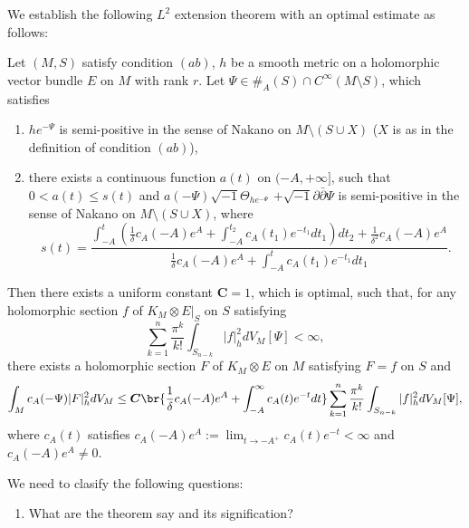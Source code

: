 \documentclass[twoside,openany,12pt]{beautynote}
\begin{document}
We establish the following $L^{2}$ extension theorem with an optimal
estimate as follows:

\begin{theorem}\label{t:guan-zhou-semicontinu2}
Let $(M,S)$ satisfy condition $(ab)$,
$h$ be a smooth metric on a holomorphic vector bundle $E$ on $M$ with rank $r$.
Let $\Psi\in \#_{A}(S)\cap C^{\infty}(M\setminus S)$, which satisfies

\begin{enumerate}[label=\arabic*)]
  \item $he^{-\Psi}$ is semi-positive in the sense of Nakano on
$M\setminus (S\cup X)$ ($X$ is as in the definition of condition
$(ab)$),
\item there exists a continuous function $a(t)$ on $(-A,+\infty]$,
such that $0<a(t)\leq s(t)$ and
$a(-\Psi)\sqrt{-1}\Theta_{he^{-\Psi}}$ $+\sqrt{-1}\partial\bar\partial\Psi$
is semi-positive in the sense of Nakano on $M\setminus (S\cup X)$,
where $$s(t)=\frac{\int_{-A}^{t}(\frac{1}
{\delta}c_{A}(-A)e^{A}+\int_{-A}^{t_{2}}c_{A}(t_{1})e^{-t_{1}}dt_{1})dt_{2}+\frac{1}{\delta^{2}}c_{A}(-A)e^{A}}
{\frac{1}{\delta}c_{A}(-A)e^{A}+\int_{-A}^{t}c_{A}(t_{1})e^{-t_{1}}dt_{1}}.$$
\end{enumerate}

Then there exists a uniform constant $\bm{C}=1$, which is
optimal, such that, for any holomorphic section $f$ of $K_{M}\otimes
E|_{S}$ on $S$ satisfying
\begin{equation}
\label{equ:condition}
\sum_{k=1}^{n}\frac{\pi^{k}}{k!}\int_{S_{n-k}}|f|^{2}_{h}dV_{M}[\Psi]<\infty,
\end{equation}
there
exists a holomorphic section $F$ of $K_{M}\otimes E$ on $M$ satisfying $F = f$ on $ S$ and
\begin{equation}
\label{equ:optimal_delta}
\int_{M}c_{A}(-\Psi)|F|^{2}_{h}dV_{M}
\leq\bm{C}\br{\frac{1}{\delta}c_{A}(-A)e^{A}+\int_{-A}^{\infty}c_{A}(t)e^{-t}dt}
\sum_{k=1}^{n}\frac{\pi^{k}}{k!}\int_{S_{n-k}}|f|^{2}_{h}dV_{M}[\Psi],
\end{equation}
where $c_{A}(t)$ satisfies $c_{A}(-A)e^{A}:=\lim_{t\to -A^{+}}c_{A}(t)e^{-t}<\infty$ and $c_{A}(-A)e^{A}\neq0$.
\end{theorem}


\begin{remark}
  We need to clasify the following questions:
  \begin{enumerate}[label=\roman*)]
    \item What are the theorem say and its signification?
  \end{enumerate}
\end{remark}
\end{document}
